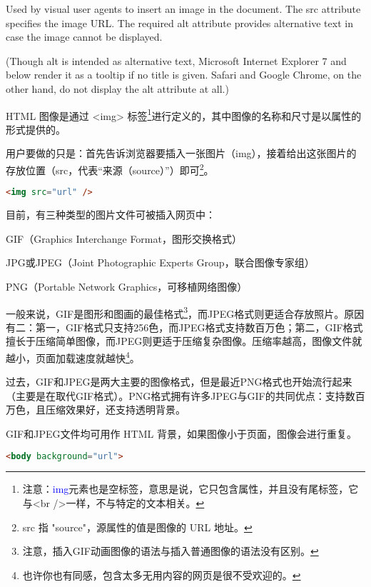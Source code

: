 Used by visual user agents to insert an image in the document. The src attribute specifies the image URL. The required alt attribute provides alternative text in case the image cannot be displayed.

(Though alt is intended as alternative text, Microsoft Internet Explorer 7 and below render it as a tooltip if no title is given. Safari and Google Chrome, on the other hand, do not display the alt attribute at all.) 



HTML 图像是通过 <img> 标签\footnote{注意：\textcolor{Blue}{img}元素也是空标签，意思是说，它只包含属性，并且没有尾标签，它与<br />一样，不与特定的文本相关。}进行定义的，其中图像的名称和尺寸是以属性的形式提供的。

用户要做的只是：首先告诉浏览器要插入一张图片（img），接着给出这张图片的存放位置（src，代表“来源（source）”）即可\footnote{src 指 "source"，源属性的值是图像的 URL 地址。}。

\begin{lstlisting}[language=HTML]
	<img src="url" />
\end{lstlisting}

目前，有三种类型的图片文件可被插入网页中：

\begin{compactitem}
\item GIF（Graphics Interchange Format，图形交换格式）
\item JPG或JPEG（Joint Photographic Experts Group，联合图像专家组）
\item PNG（Portable Network Graphics，可移植网络图像）
\end{compactitem}

一般来说，GIF是图形和图画的最佳格式\footnote{注意，插入GIF动画图像的语法与插入普通图像的语法没有区别。}，而JPEG格式则更适合存放照片。原因有二：第一，GIF格式只支持256色，而JPEG格式支持数百万色；第二，GIF格式擅长于压缩简单图像，而JPEG则更适于压缩复杂图像。压缩率越高，图像文件就越小，页面加载速度就越快\footnote{也许你也有同感，包含太多无用内容的网页是很不受欢迎的。}。

过去，GIF和JPEG是两大主要的图像格式，但是最近PNG格式也开始流行起来（主要是在取代GIF格式）。PNG格式拥有许多JPEG与GIF的共同优点：支持数百万色，且压缩效果好，还支持透明背景。

GIF和JPEG文件均可用作 HTML 背景，如果图像小于页面，图像会进行重复。

\begin{lstlisting}[language=HTML]
	<body background="url">
\end{lstlisting}


